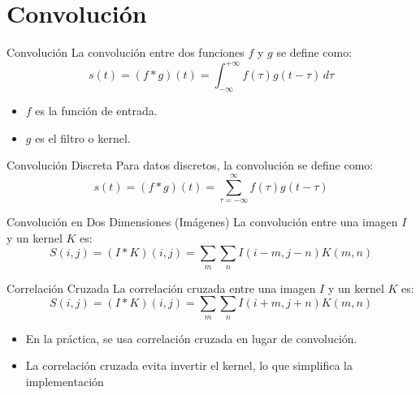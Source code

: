 \section{Convolución}

\begin{frame}
    \begin{block}{Convolución}
        La convolución entre dos funciones \( f \) y \( g \) se define como:
        \[
        s(t) = (f \ast g)(t) = \int_{-\infty}^{+\infty} f(\tau) g(t - \tau) \, d\tau
        \]
    \end{block}
    
    \begin{itemize}
        \item \( f \) es la función de entrada.
        \item \( g \) es el filtro o kernel.
    \end{itemize}
\end{frame}


\begin{frame}
    \begin{block}{Convolución Discreta}
        Para datos discretos, la convolución se define como:
        \[
        s(t) = (f \ast g)(t) = \sum_{\tau = -\infty}^{\infty} f(\tau) g(t - \tau)
        \]
    \end{block}
    
    \begin{block}{Convolución en Dos Dimensiones (Imágenes)}
        La convolución entre una imagen \( I \) y un kernel \( K \) es:
        \[
        S(i, j) = (I \ast K)(i, j) = \sum_m \sum_n I(i - m, j - n) K(m, n)
        \]
    \end{block}
\end{frame}


\begin{frame}
    \begin{block}{Correlación Cruzada}
        La correlación cruzada entre una imagen \( I \) y un kernel \( K \) es:
        \[
        S(i, j) = (I \ast K)(i, j) = \sum_m \sum_n I(i + m, j + n) K(m, n)
        \]
    \end{block}

    \begin{itemize}
        \item 
        En la práctica, se usa correlación cruzada en lugar de convolución.
        \item 
        La correlación cruzada evita invertir el kernel, lo que simplifica la implementación
    \end{itemize}
\end{frame}



